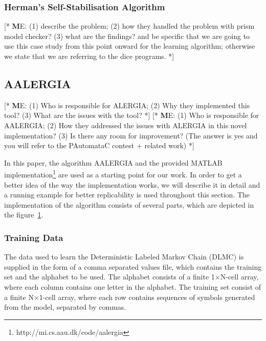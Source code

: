 \documentclass[
a4paper,     %
12pt         %
]{scrartcl}  %
\newcommand\me[1]{ [* {\textbf ME:} #1 *]}
\begin{document}
\subsubsection{Herman's Self-Stabilisation Algorithm}
\me{(1) describe the problem; (2) how they handled the problem with prism model checker? (3) what are the findings? and be specific that we are going to use this case study from this point onward for the learning algorithm; otherwise we state that we are referring to the dice programs.}
\subsection{AALERGIA}
\me{(1) Who is responsible for ALERGIA; (2) Why they implemented this tool? (3) What are the issues with the tool?}
\me{(1) Who is responsible for AALERGIA; (2) How they addressed the issues with ALERGIA in this novel implementation? (3) Is there any room for improvement? (The answer is yes and you will refer to the PAutomataC contest + related work)}

In this paper, the algorithm AALERGIA\cite{Mao.} and the provided MATLAB implementation\footnote{http://mi.cs.aau.dk/code/aalergia} are used as a starting point for our work. In order to get a better idea of the way the implementation works, we will describe it in detail and a running example for better replicability is used throughout this section. The implementation of the algorithm consists of several parts, which are depicted in the figure~\ref{fig:diaAalergia}.

\begin{figure}[H]
\begin{center}
\end{center}
     \label{fig:diaAalergia}
\end{figure}

\subsubsection{Training Data}
The data used to learn the Deterministic Labeled Markov Chain (DLMC) is supplied in the form of a comma separated values file, which contains the training set and the alphabet to be used. The alphabet consists of a finite 1$\times$N-cell array, where each column contains one letter in the alphabet. The training set consist of a finite N$\times$1-cell array, where each row contains sequences of symbols generated from the model, separated by commas.
\end{document}

